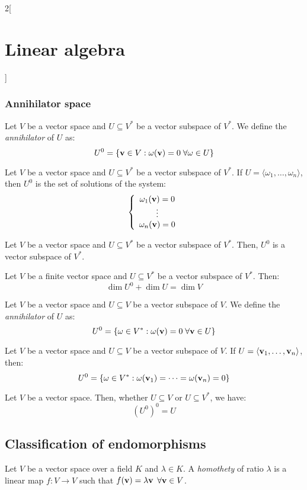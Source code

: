 \documentclass[../../../main.tex]{subfiles}
\begin{document}
\begin{multicols}{2}[\section{Linear algebra}]
  \subsubsection{Annihilator space}
  \begin{definition}
    Let $V$ be a vector space and $U\subseteq V^*$ be a vector subspace of $V^*$. We define the \emph{annihilator} of $U$ as:
    $$U^0=\{\boldsymbol{\mathrm{v}}\in V:\omega(\boldsymbol{\mathrm{v}})=0\;\forall\omega\in U\}$$
  \end{definition}
  \begin{lemma}
    Let $V$ be a vector space and $U\subseteq V^*$ be a vector subspace of $V^*$. If $U=\langle\omega_1,\ldots,\omega_n\rangle$, then $U^0$ is the set of solutions of the system:
    $$\left\{
      \begin{array}{c}
        \omega_1(\boldsymbol{\mathrm{v}})=0 \\
        \vdots             \\
        \omega_n(\boldsymbol{\mathrm{v}})=0
      \end{array}
      \right.$$
  \end{lemma}
  \begin{lemma}
    Let $V$ be a vector space and $U\subseteq V^*$ be a vector subspace of $V^*$. Then, $U^0$ is a vector subspace of $V^*$.
  \end{lemma}
  \begin{theorem}
    Let $V$ be a finite vector space and $U\subseteq V^*$ be a vector subspace of $V^*$. Then: $$\dim U^0+\dim U=\dim V$$
  \end{theorem}
  \begin{definition}
    Let $V$ be a vector space and $U\subseteq V$ be a vector subspace of $V$. We define the \emph{annihilator} of $U$ as:
    $$U^0=\{\omega\in V^*:\omega(\boldsymbol{\mathrm{v}})=0\;\forall\boldsymbol{\mathrm{v}}\in U\}$$
  \end{definition}
  \begin{lemma}
    Let $V$ be a vector space and $U\subseteq V$  be a vector subspace of $V$. If $U=\langle\boldsymbol{\mathrm{v}}_1,\ldots,\boldsymbol{\mathrm{v}}_n\rangle$, then: $$U^0=\{\omega\in V^*:\omega(\boldsymbol{\mathrm{v}}_1)=\cdots=\omega(\boldsymbol{\mathrm{v}}_n)=0\}$$
  \end{lemma}
  \begin{proposition}
    Let $V$ be a vector space. Then, whether $U\subseteq V$ or $U\subseteq V^*$, we have: $${(U^0)}^0=U$$
  \end{proposition}
  \subsection{Classification of endomorphisms}
  \begin{definition}
    Let $V$ be a vector space over a field $K$ and $\lambda\in K$. A \emph{homothety} of ratio $\lambda$ is a linear map $f:V\rightarrow V$ such that $f(\boldsymbol{\mathrm{v}})=\lambda\boldsymbol{\mathrm{v}}$ $\forall\boldsymbol{\mathrm{v}}\in V$.
  \end{definition}

\end{multicols}
\end{document}
